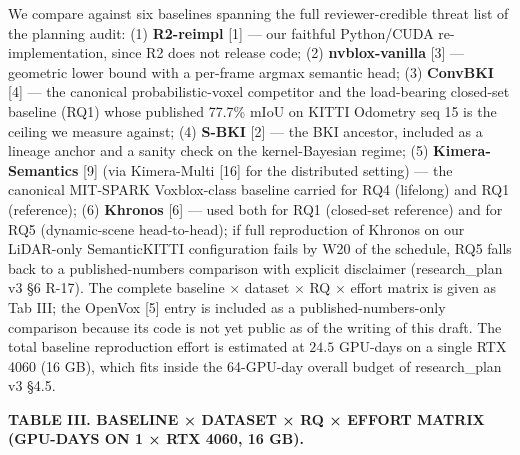 \documentclass[
]{article}
\begin{document}
We compare against six baselines spanning the full reviewer-credible
threat list of the planning audit: (1) \textbf{R2-reimpl} {[}1{]} ---
our faithful Python/CUDA re-implementation, since R2 does not release
code; (2) \textbf{nvblox-vanilla} {[}3{]} --- geometric lower bound with
a per-frame argmax semantic head; (3) \textbf{ConvBKI} {[}4{]} --- the
canonical probabilistic-voxel competitor and the load-bearing closed-set
baseline (RQ1) whose published 77.7\% mIoU on KITTI Odometry seq 15 is
the ceiling we measure against; (4) \textbf{S-BKI} {[}2{]} --- the BKI
ancestor, included as a lineage anchor and a sanity check on the
kernel-Bayesian regime; (5) \textbf{Kimera-Semantics} {[}9{]} (via
Kimera-Multi {[}16{]} for the distributed setting) --- the canonical
MIT-SPARK Voxblox-class baseline carried for RQ4 (lifelong) and RQ1
(reference); (6) \textbf{Khronos} {[}6{]} --- used both for RQ1
(closed-set reference) and for RQ5 (dynamic-scene head-to-head); if full
reproduction of Khronos on our LiDAR-only SemanticKITTI configuration
fails by W20 of the schedule, RQ5 falls back to a published-numbers
comparison with explicit disclaimer (research\_plan v3 §6 R-17). The
complete baseline × dataset × RQ × effort matrix is given as Tab III;
the OpenVox {[}5{]} entry is included as a published-numbers-only
comparison because its code is not yet public as of the writing of this
draft. The total baseline reproduction effort is estimated at \(24.5\)
GPU-days on a single RTX 4060 (16 GB), which fits inside the 64-GPU-day
overall budget of research\_plan v3 §4.5.

\textbf{TABLE III. BASELINE × DATASET × RQ × EFFORT MATRIX (GPU-DAYS ON
1 × RTX 4060, 16 GB).}
\end{document}
